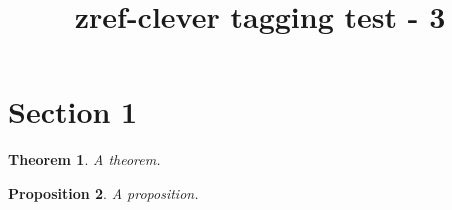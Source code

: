 \documentclass{article}
\title{zref-clever tagging test - 3}
\newtheorem{mytheorem}{Theorem}[section]
\newtheorem{myproposition}[mytheorem]{Proposition}
\begin{document}
\section{Section 1}
\begin{mytheorem}
A theorem.
\end{mytheorem}
\begin{myproposition}
A proposition.
\end{myproposition}
\end{document}
